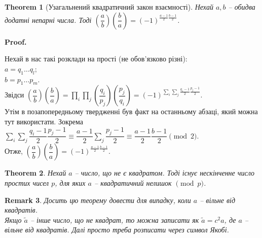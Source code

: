 \documentclass[a4paper, 10pt]{article}
\makeatletter
\theoremstyle{theoremdd}
\newtheorem{theorem}{Theorem}[subsection]
\theoremstyle{theoremdd}
\theoremstyle{theoremdd}
\theoremstyle{theoremdd}
\theoremstyle{theoremdd}
\theoremstyle{theoremdd}
\newtheorem{remark}[theorem]{Remark}
\theoremstyle{theoremdd}
\theoremstyle{theoremdd}
\renewenvironment{proof}[1][Proof.\\]{\par
\pushQED{\hfill \qed}%
\normalfont \topsep6\p@\@plus6\p@\relax
\trivlist
\item\relax
{\bfseries
#1\@addpunct{.}}\hspace\labelsep\ignorespaces
}{%
\popQED\endtrivlist\@endpefalse
}
\makeatother
\begin{document}
\begin{theorem}[Узагальнений квадратичний закон взаємності]
Нехай $a,b$ -- обидва додатні непарні числа. Тоді $\left( \dfrac{a}{b} \right) \left( \dfrac{b}{a} \right) = (-1)^{\frac{a-1}{2} \frac{b-1}{2}}$.
\end{theorem}

\begin{proof}
Нехай в нас такі розклади на прості (не обов'язково різні):\\
$a = q_1 \dots q_l$;\\
$b = p_1 \dots p_m$.\\
Звідси $\left( \dfrac{a}{b} \right) \left( \dfrac{b}{a} \right) = \displaystyle\prod_i \prod_j \left( \dfrac{q_i}{p_j} \right) \left( \dfrac{p_j}{q_i} \right) = (-1)^{\sum_i \sum_j \frac{q_1-1}{2} \frac{p_j-1}{2}}$.\\
Утім в позапопередньому твердженні був факт на останньому абзаці, який можна тут використати. Зокрема\\
$\displaystyle\sum_i \sum_j \dfrac{q_i-1}{2} \dfrac{p_j-1}{2} \equiv \dfrac{a-1}{2} \sum_j \dfrac{p_j - 1}{2} \equiv \dfrac{a-1}{2} \dfrac{b-1}{2} \pmod 2$.\\
Отже, $\left( \dfrac{a}{b} \right) \left( \dfrac{b}{a} \right) = (-1)^{\frac{a-1}{2} \frac{b-1}{2}}$.
\end{proof}

\begin{theorem}
Нехай $a$ -- число, що не є квадратом. Тоді існує нескінченне число простих чисел $p$, для яких $a$ -- квадратичний нелишок $\!\!\pmod p$. 
\end{theorem}

\begin{remark}
Досить цю теорему довести для випадку, коли $a$ -- вільне від квадратів.\\
Якщо $\tilde{a}$ -- інше число, що не квадрат, то можна записати як $\tilde{a} = c^2 a$, де $a$ -- вільне від квадратів. Далі просто треба розписати через символ Якобі.
\end{remark}
\end{document}
